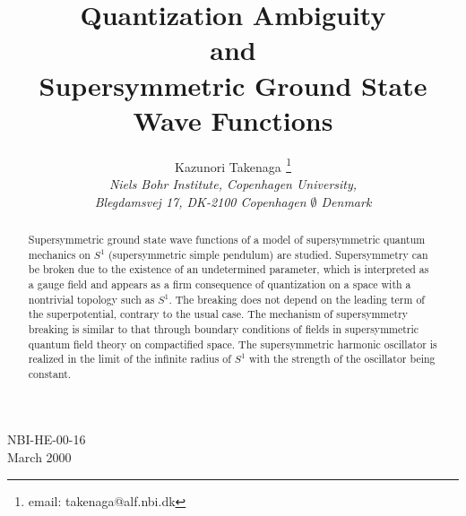 \documentclass[a4paper,12pt]{article}
\begin{document}
\title{Quantization Ambiguity \\and \\
Supersymmetric Ground State Wave Functions}
\author{Kazunori Takenaga \vspace{1cm}$^{}$\thanks {email: 
takenaga@alf.nbi.dk}\\ 
\it {Niels Bohr Institute, Copenhagen University,}\\ 
{\it Blegdamsvej 17, DK-2100 Copenhagen $\emptyset$ Denmark}}
\date{} %
\maketitle
\baselineskip=18pt
\vskip 3cm
\begin{abstract}
Supersymmetric ground state wave functions of 
a model of supersymmetric quantum mechanics on $S^1$ (supersymmetric 
simple pendulum) are studied. Supersymmetry can be broken due to the 
existence of an undetermined parameter, which is interpreted 
as a gauge field and appears as 
a firm consequence of quantization on a space with 
a nontrivial topology such as $S^1$. The breaking does not depend on 
the leading term of the superpotential, contrary to the usual case.
The mechanism of supersymmetry breaking is similar to that through  
boundary conditions of fields in supersymmetric
quantum field theory on compactified space. 
The supersymmetric harmonic oscillator is 
realized in the limit of the infinite 
radius of $S^1$ with the strength of the oscillator being constant.
\end{abstract}
\vskip 2cm
\begin{flushleft}
NBI-HE-00-16\\
March 2000\\
\end{flushleft}
\addtolength{\parindent}{2pt}
\newpage
\end{document}
